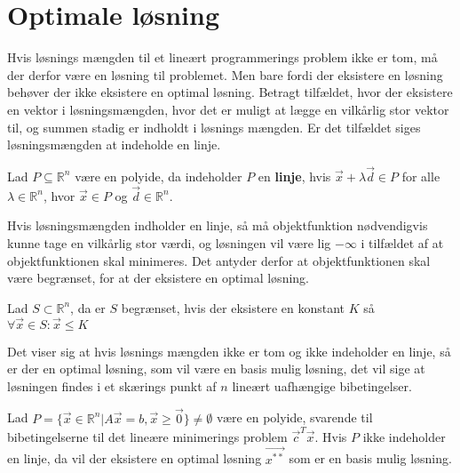 \section{Optimale løsning}
Hvis løsnings mængden til et lineært programmerings problem ikke er tom, må der derfor være en løsning til problemet.
Men bare fordi der eksistere en løsning behøver der ikke eksistere en optimal løsning. 
Betragt tilfældet, hvor der eksistere en vektor i løsningsmængden, hvor det er muligt at lægge en vilkårlig stor vektor til, og summen stadig er indholdt i løsnings mængden.
Er det tilfældet siges løsningsmængden at indeholde en linje.
\begin{defn}[Linje]
Lad $P\subseteq \mathds{R}^n $ være en polyide, da indeholder $P$ en \textbf{linje}, hvis $\vec{x}+\lambda\vec{d} \in P$ for alle $\lambda \in \mathds{R}^n$, hvor $\vec{x}\in P$ og $\vec{d} \in \mathds{R}^n$.
\end{defn}
Hvis løsningsmængden indholder en linje, så må objektfunktion nødvendigvis kunne tage en vilkårlig stor værdi, og løsningen vil være lig $-\infty$ i tilfældet af at objektfunktionen skal minimeres. 
Det antyder derfor at objektfunktionen skal være begrænset, for at der eksistere en optimal løsning.
\begin{defn} [Begrænset]
Lad $S \subset \mathds{R}^n$, da er $S$ begrænset, hvis der eksistere en konstant $K$ så $\forall \vec{x} \in S: \vec{x} \leq K$
\end{defn}
Det viser sig at hvis løsnings mængden ikke er tom og ikke indeholder en linje, så er der en optimal løsning, som vil være en basis mulig løsning, det vil sige at løsningen findes i et skærings punkt af $n$ lineært uafhængige bibetingelser.
\begin{stn}
Lad $P=\{\vec{x} \in \mathds{R}^n| A \vec{x} = b, \vec{x} \geq \vec{0}\} \neq \emptyset$ være en polyide, svarende til bibetingelserne til det lineære minimerings problem $\vec{c}^T\vec{x}$. Hvis $P$ ikke indeholder en linje, da vil der eksistere en optimal løsning $\vec{x^{**}}$ som er en basis mulig løsning.
\label{stn:eksistens}
\end{stn}
